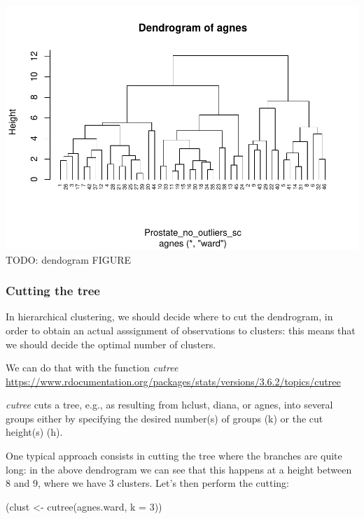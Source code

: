 \documentclass[
]{article}
\newenvironment{Shaded}{\begin{snugshade}}{\end{snugshade}}
\newcommand{\AttributeTok}[1]{\textcolor[rgb]{0.77,0.63,0.00}{#1}}
\newcommand{\DecValTok}[1]{\textcolor[rgb]{0.00,0.00,0.81}{#1}}
\newcommand{\FunctionTok}[1]{\textcolor[rgb]{0.00,0.00,0.00}{#1}}
\newcommand{\NormalTok}[1]{#1}
\newcommand{\OtherTok}[1]{\textcolor[rgb]{0.56,0.35,0.01}{#1}}
\begin{document}
\includegraphics{clustering_files/figure-latex/unnamed-chunk-33-1.pdf}
TODO: dendogram FIGURE

\hypertarget{cutting-the-tree}{%
\subsubsection{Cutting the tree}\label{cutting-the-tree}}

In hierarchical clustering, we should decide where to cut the
dendrogram, in order to obtain an actual asssignment of observations to
clusters: this means that we should decide the optimal number of
clusters.

We can do that with the function \emph{cutree}
\url{https://www.rdocumentation.org/packages/stats/versions/3.6.2/topics/cutree}

\emph{cutree} cuts a tree, e.g., as resulting from hclust, diana, or
agnes, into several groups either by specifying the desired number(s) of
groups (k) or the cut height(s) (h).

One typical approach consists in cutting the tree where the branches are
quite long: in the above dendrogram we can see that this happens at a
height between 8 and 9, where we have 3 clusters. Let's then perform the
cutting:

\begin{Shaded}
\begin{Highlighting}[]
\NormalTok{(clust }\OtherTok{\textless{}{-}} \FunctionTok{cutree}\NormalTok{(agnes.ward, }\AttributeTok{k =} \DecValTok{3}\NormalTok{)) }
\end{Highlighting}
\end{Shaded}
\end{document}
